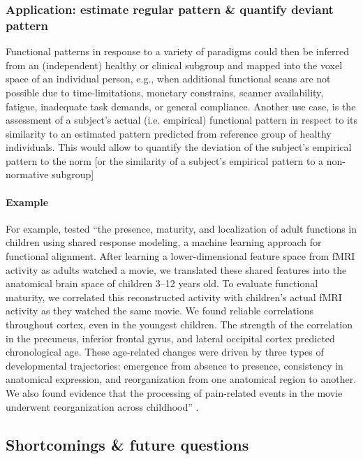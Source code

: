 \subsubsection{Application: estimate regular pattern \& quantify deviant
pattern}

%
Functional patterns in response to a variety of paradigms could then be inferred
from an (independent) healthy or clinical subgroup and mapped into the voxel
space of an individual person, e.g.,
%
when additional functional scans are not possible due to time-limitations,
monetary constrains, scanner availability, fatigue, inadequate task demands, or
general compliance.
%
Another use case, is the assessment of a subject's actual (i.e. empirical)
functional pattern in respect to its similarity to  an estimated pattern
predicted from reference group of healthy individuals.
%
This would allow to quantify the deviation of the subject's empirical pattern to
the norm [or the similarity of a subject's empirical pattern to a non-normative
subgroup]


\paragraph{Example}


%
For example, \citet{yates2021emergence} tested ``the presence, maturity, and
localization of adult functions in children using shared response modeling, a
machine learning approach for functional alignment.
%
After learning a lower-dimensional feature space from fMRI activity as adults
watched a movie, we translated these shared features into the anatomical brain
space of children 3--12 years old.
%
To evaluate functional maturity, we correlated this reconstructed activity with
children’s actual fMRI activity as they watched the same movie. We found
reliable correlations throughout cortex, even in the youngest children.
%
The strength of the correlation in the precuneus, inferior frontal gyrus, and
lateral occipital cortex predicted chronological age.
%
These age-related changes were driven by three types of developmental
trajectories: emergence from absence to presence, consistency in anatomical
expression, and reorganization from one anatomical region to another.
%
We also found evidence that the processing of pain-related events in the movie
underwent reorganization across childhood'' \citep{yates2021emergence}.


\subsection{Shortcomings \& future questions}


